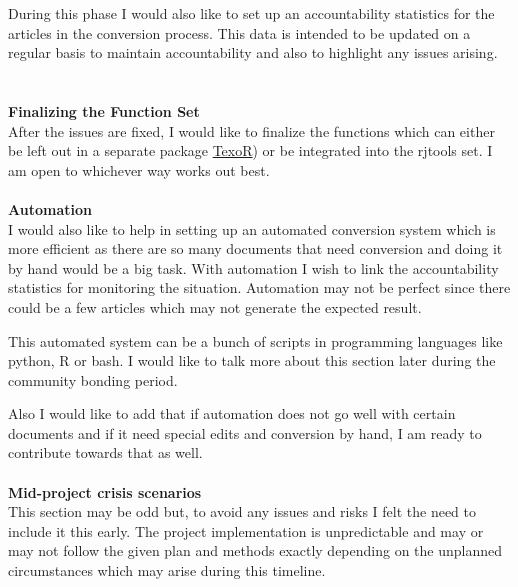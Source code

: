 \documentclass[12pt]{article}
\begin{document}
 During this phase I would also like to set up an accountability statistics for the articles in the conversion process. This data is intended to be updated on a regular basis to maintain accountability and also to highlight any issues arising.\\
 \\
 \\
 {\large\bfseries Finalizing the Function Set}\\ 
 After the issues are fixed, I would like to finalize the functions which can either be left out in a separate package \href{https://github.com/Abhi-1U/TexoR}{\color{orange}TexoR}) or be integrated into the rjtools set. I am open to whichever way works out best.\\
 \\
 {\large\bfseries Automation}\\
 I would also like to help in setting up an automated conversion system which is more efficient as there are so many documents that need conversion and doing it by hand would be a big task. With automation I wish to link the accountability statistics for monitoring the situation. Automation may not be perfect since there could be a few articles which may not generate the expected result.
 
 This automated system can be a bunch of scripts in programming languages like python, R or bash. I would like to talk more about this section later during the community bonding period.
 
  Also I would like to add that if automation does not go well with certain documents and if it need special edits and conversion by hand, I am ready to contribute towards that as well. \\
 \\
 {\large\bfseries Mid-project crisis scenarios}\\
 This section may be odd but, to avoid any issues and risks I felt the need to include it this early. The project implementation is unpredictable and may or may not follow the given plan and methods exactly depending on the unplanned circumstances which may arise during this timeline. 
 
\end{document}
